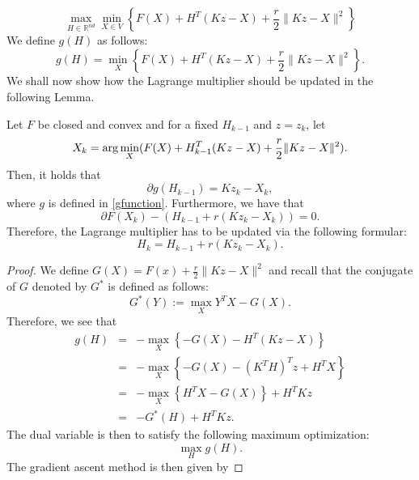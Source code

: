 \begin{itemize}
\begin{equation}\label{main:eq} 
\max_{H \in \mathbb{R}^{nd}}  \min_{X \in V} \left \{ F(X) + H^T (Kz - X) + \frac{r}{2} \|Kz - X\|^2 \right \}
\end{equation}
We define $g(H)$ as follows: 
\begin{equation}\label{gfunction}
g(H) = \min_{X} \left \{ F(X) + H^T (Kz - X) + \frac{r}{2} \|Kz - X\|^2 \right \}. 
\end{equation}
We shall now show how the Lagrange multiplier should be updated in the following Lemma. 
\begin{lemma}
Let $F$ be closed and convex and for a fixed $H_{k-1}$ and $z = z_k$, let 
\begin{equation} 
X_k = {\rm arg}\min_{X} ( F(X) + H_{k-1}^T (Kz - X) + \frac{r}{2} \|Kz - X\|^2).  
\end{equation} 
Then, it holds that 
\begin{equation} 
\partial g(H_{k-1}) = Kz_k - X_k,  
\end{equation}
where $g$ is defined in \eqref{gfunction}. 
Furthermore, we have that
\begin{equation} 
\partial F(X_k) - (H_{k-1} + r (K z_k - X_k)) = 0. 
\end{equation} 
Therefore, the Lagrange multiplier has to be updated via the following formular: 
\begin{equation}
H_k = H_{k-1} + r (Kz_k - X_k). 
\end{equation}
\end{lemma}
\begin{proof} 
We define $G(X) = F(x) + \frac{r}{2} \|Kz - X\|^2$ and recall that the conjugate of $G$ denoted by $G^*$ is defined as follows: 
\begin{equation}
G^*(Y) := \max_{X} Y^T X - G(X). 
\end{equation}
Therefore, we see that 
\begin{eqnarray*} 
g(H) &=& -\max_X \left \{ -G(X) - H^T (Kz - X)  \right \} \\ 
&=&  -\max_X \left \{ -G(X) - (K^T H)^T z + H^TX \right \} \\
&=&  - \max_X \left \{ H^T X - G(X) \right \} + H^T K z \\
&=& - G^*(H) + H^TKz. 
\end{eqnarray*} 
The dual variable is then to satisfy the following maximum optimization: 
\begin{equation} 
\max_H g(H). 
\end{equation} 
The gradient ascent method is then given by 

\end{proof}
\end{itemize}
